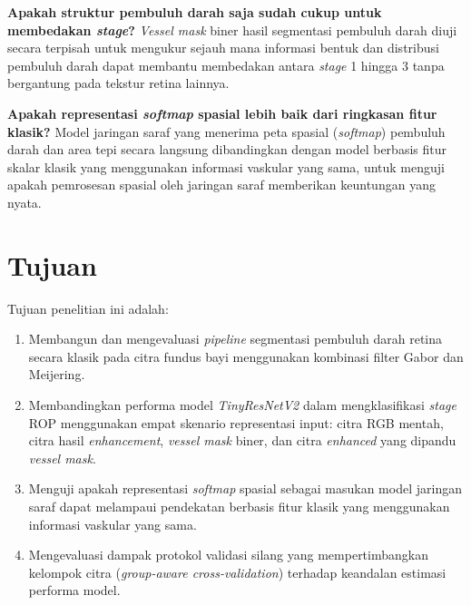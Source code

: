 \vspace{2mm}
\noindent\textbf{Apakah struktur pembuluh darah saja sudah cukup untuk membedakan \textit{stage}?}
\textit{Vessel mask} biner hasil segmentasi pembuluh darah diuji secara terpisah untuk
mengukur sejauh mana informasi bentuk dan distribusi pembuluh darah dapat membantu membedakan
antara \textit{stage} 1 hingga 3 tanpa bergantung pada tekstur retina lainnya.

\vspace{2mm}
\noindent\textbf{Apakah representasi \textit{softmap} spasial lebih baik dari ringkasan fitur klasik?}
Model jaringan saraf yang menerima peta spasial (\textit{softmap}) pembuluh darah dan area
tepi secara langsung dibandingkan dengan model berbasis fitur skalar klasik yang menggunakan
informasi vaskular yang sama, untuk menguji apakah pemrosesan spasial oleh jaringan saraf
memberikan keuntungan yang nyata.

\section{Tujuan}

Tujuan penelitian ini adalah:

\begin{enumerate}
    \item Membangun dan mengevaluasi \textit{pipeline} segmentasi pembuluh darah retina secara
    klasik pada citra fundus bayi menggunakan kombinasi filter Gabor dan Meijering.
    \item Membandingkan performa model \textit{TinyResNetV2} dalam mengklasifikasi
    \textit{stage} ROP menggunakan empat skenario representasi input: citra RGB mentah,
    citra hasil \textit{enhancement}, \textit{vessel mask} biner, dan citra \textit{enhanced}
    yang dipandu \textit{vessel mask}.
    \item Menguji apakah representasi \textit{softmap} spasial sebagai masukan model jaringan
    saraf dapat melampaui pendekatan berbasis fitur klasik yang menggunakan informasi
    vaskular yang sama.
    \item Mengevaluasi dampak protokol validasi silang yang mempertimbangkan kelompok citra
    (\textit{group-aware cross-validation}) terhadap keandalan estimasi performa model.
\end{enumerate}

